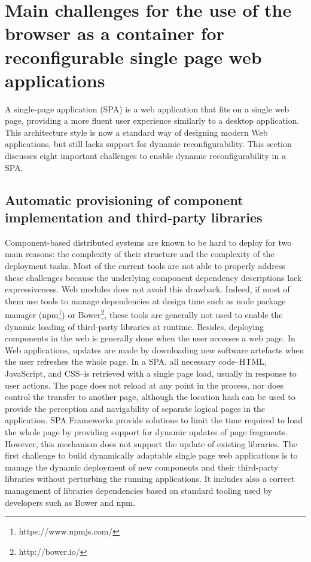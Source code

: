 \section{Main challenges for the use of the browser as a container for reconfigurable single page web applications }
A single-page application (SPA) is a web application that fits on a single web page, providing a more fluent user experience similarly to a desktop application.
This architecture style is now a standard way of designing modern Web applications, but still lacks support for dynamic reconfigurability.
This section discusses eight important challenges to enable dynamic reconfigurability in a SPA.

\subsection{Automatic provisioning of component implementation and third-party libraries}

Component-based distributed systems are known to be hard to deploy for two main reasons: the complexity of their structure and the complexity of the deployment tasks. Most of the current tools are not able to properly address these challenges because the underlying component dependency descriptions lack expressiveness. Web modules does not avoid this drawback. Indeed, if most of them use tools to manage dependencies at design time such as node package manager (npm\footnote{https://www.npmjs.com/}) or Bower\footnote{http://bower.io/}, these tools are generally not used to enable the dynamic loading of third-party libraries at runtime. Besides, deploying components in the web is generally done when the user accesses a web page. In Web applications, updates are made by downloading new software artefacts when the user refreshes the whole page. In a SPA, all necessary code\---HTML, JavaScript, and CSS\---is retrieved with a single page load, usually in response to user actions. The page does not reload at any point in the process, nor does control the transfer to another page, although the location hash can be used to provide the perception and navigability of separate logical pages in the application. SPA Frameworks provide solutions to limit the time required to load the whole page by providing support for dynamic updates of page fragments. However, this mechanism does not support the update of existing libraries. The first challenge to build dynamically adaptable single page web applications is to manage the dynamic deployment of new components and their third-party libraries without perturbing the running applications. It includes also a correct management of libraries dependencies based on standard tooling used by developers such as Bower and npm.

